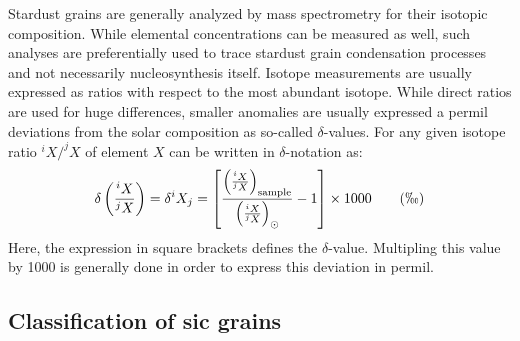 Stardust grains are generally analyzed by mass spectrometry for their isotopic composition. While elemental concentrations can be measured as well, such analyses are preferentially used to trace stardust grain condensation processes and not necessarily nucleosynthesis itself. Isotope measurements are usually expressed as ratios with respect to the most abundant isotope. While direct ratios are used for huge differences, smaller anomalies are usually expressed a permil deviations from the solar composition as so-called $\delta$-values. For any given isotope ratio $^{i}X/^{j}X$ of element $X$ can be written in $\delta$-notation as:
\begin{equation}
    \delta\left(\frac{^iX}{^jX}\right) = \delta {^{i}}X_{j} =  \left[\frac{\left(\frac{^iX}{^jX}\right)_\mathrm{sample}}{\left(\frac{^iX}{^jX}\right)_\odot} - 1\right] \times 1000 \qquad (\permil) \label{eqn:stardust:delta_notation}
\end{equation}
Here, the expression in square brackets defines the $\delta$-value. Multipling this value by 1000 is generally done in order to express this deviation in permil.


\subsection{Classification of \ac{sic} grains}

